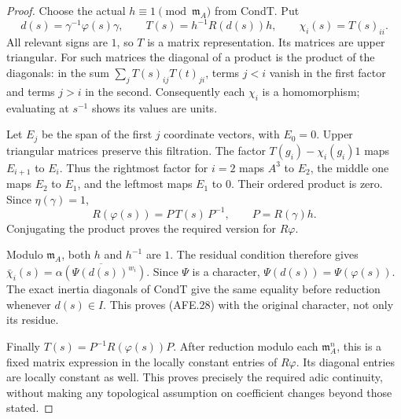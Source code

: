 \documentclass[11pt,a4paper]{article}
\numberwithin{equation}{section}
\theoremstyle{remark}\newtheorem{remark}[theorem]{Remark}
\begin{document}
\begin{proof}
Choose the actual \(h\equiv1\pmod{\mathfrak m_A}\)
from CondT.  Put
\[
 d(s)=\gamma^{-1}\varphi(s)\gamma,\qquad
 T(s)=h^{-1}R(d(s))h,\qquad \chi_i(s)=T(s)_{ii}.
 \]
All relevant signs are \(1\), so \(T\) is a matrix
representation.  Its matrices are upper triangular.
For such matrices the diagonal of a product is the
product of the diagonals: in the sum
\(\sum_j T(s)_{ij}T(t)_{ji}\), terms \(j<i\)
vanish in the first factor and terms \(j>i\)
in the second.  Consequently each \(\chi_i\)
is a homomorphism; evaluating at \(s^{-1}\)
shows its values are units.

Let \(E_j\) be the span of the first \(j\) coordinate
vectors, with \(E_0=0\).
Upper triangular matrices preserve this filtration.
The factor \(T(g_i)-\chi_i(g_i)1\) maps
\(E_{i+1}\) to \(E_i\).
Thus the rightmost factor for \(i=2\) maps \(A^3\)
to \(E_2\), the middle one maps \(E_2\) to \(E_1\),
and the leftmost maps \(E_1\) to \(0\).
Their ordered product is zero.
Since \(\eta(\gamma)=1\),
\[
 R(\varphi(s))=P\,T(s)\,P^{-1},\qquad P=R(\gamma)h.
 \]
Conjugating the product proves the required version
for \(R\varphi\).

Modulo \(\mathfrak m_A\), both \(h\) and \(h^{-1}\)
are \(1\).
The residual condition therefore gives
\(\bar\chi_i(s)=
 \overline{\alpha(\Psi(d(s))^{w_i})}\).
Since \(\Psi\) is a character,
\(\Psi(d(s))=\Psi(\varphi(s))\).
The exact inertia diagonals of CondT give the same
equality before reduction whenever \(d(s)\in I\).
This proves (AFE.28) with the original character,
not only its residue.

Finally
\(T(s)=P^{-1}R(\varphi(s))P\).
After reduction modulo each \(\mathfrak m_A^n\),
this is a fixed matrix expression in the locally
constant entries of \(R\varphi\).
Its diagonal entries are locally constant as well.
This proves precisely the required adic continuity,
without making any topological assumption on
coefficient changes beyond those stated.
\end{proof}

\end{document}
